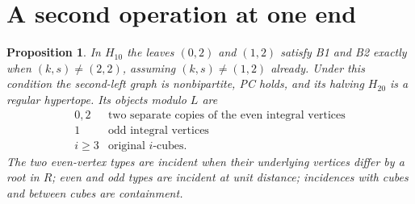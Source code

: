 \documentclass[11pt,a4paper]{article}
\newtheorem{proposition}[theorem]{Proposition}
\begin{document}
\section{A second operation at one end}
\begin{proposition}\label{second}
In $H_{10}$ the leaves $(0,2)$ and $(1,2)$ satisfy B1 and B2
exactly when $(k,s)\ne(2,2)$, assuming $(k,s)\ne(1,2)$ already.
Under this condition the second-left graph is nonbipartite, PC
holds, and its halving $H_{20}$ is a regular hypertope. Its objects
modulo $L$ are
\[
\begin{array}{c|l}
0,2&\text{two separate copies of the even integral vertices}\\
1&\text{odd integral vertices}\\
i\ge3&\text{original }i\text{-cubes}.
\end{array}
\]
The two even-vertex types are incident when their underlying vertices
differ by a root in $R$; even and odd types are incident at unit
distance; incidences with cubes and between cubes are containment.
\end{proposition}
\end{document}
